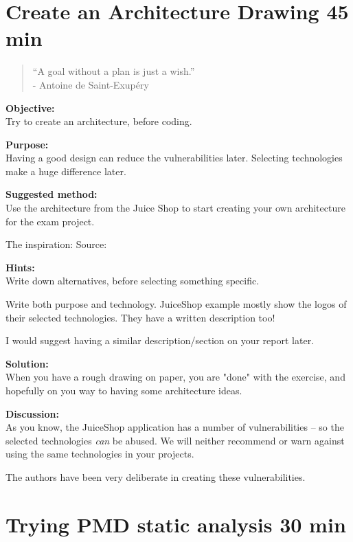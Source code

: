 \documentclass[a4paper,11pt,notitlepage]{report}
\begin{document}
\chapter{Create an Architecture Drawing 45 min}
\label{ex:architecture-drawing}

\begin{quote}
  “A goal without a plan is just a wish.”\\
  - Antoine de Saint-Exupéry
\end{quote}


{\bf Objective:}\\
Try to create an architecture, before coding.

{\bf Purpose:}\\
Having a good design can reduce the vulnerabilities later. Selecting technologies make a huge difference later.


{\bf Suggested method:}\\
Use the architecture from the Juice Shop to start creating your own architecture for the exam project.

The inspiration:
Source: 

{\bf Hints:}\\
Write down alternatives, before selecting something specific.

Write both purpose and technology. JuiceShop example mostly show the logos of their selected technologies. They have a written description too! 

I would suggest having a similar description/section on your report later.

{\bf Solution:}\\
When you have a rough drawing on paper, you are "done" with the exercise, and hopefully on you way to having some architecture ideas.

{\bf Discussion:}\\
As you know, the JuiceShop application has a number of vulnerabilities -- so the selected technologies \emph{can} be abused. We will neither recommend or warn against using the same technologies in your projects.

The authors have been very deliberate in creating these vulnerabilities.




\chapter{Trying PMD static analysis 30 min}
\label{ex:pmd-static}
\end{document}
